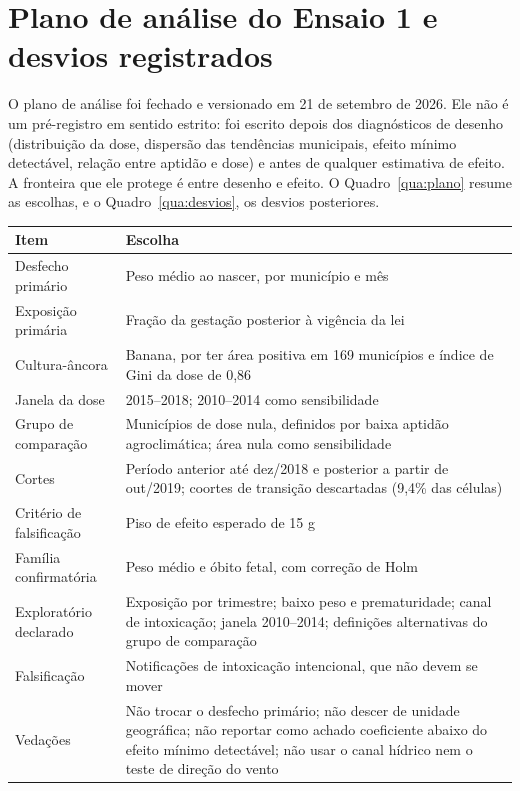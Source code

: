
\chapter{Plano de análise do Ensaio 1 e desvios registrados}
\label{ap:preespecificacao}

O plano de análise foi fechado e versionado em 21 de setembro de 2026. Ele não
é um pré-registro em sentido estrito: foi escrito depois dos diagnósticos de
desenho (distribuição da dose, dispersão das tendências municipais, efeito
mínimo detectável, relação entre aptidão e dose) e antes de qualquer estimativa
de efeito. A fronteira que ele protege é entre desenho e efeito. O
Quadro~\ref{qua:plano} resume as escolhas, e o Quadro~\ref{qua:desvios}, os
desvios posteriores.

\begin{quadro}[htb]
\centering
\caption{Escolhas do plano de análise}
\label{qua:plano}
\small
\begin{tabular}{|p{4.2cm}|p{10cm}|}
\hline
\textbf{Item} & \textbf{Escolha} \\
\hline
Desfecho primário & Peso médio ao nascer, por município e mês \\
\hline
Exposição primária & Fração da gestação posterior à vigência da lei \\
\hline
Cultura-âncora & Banana, por ter área positiva em 169 municípios e índice de
Gini da dose de 0,86 \\
\hline
Janela da dose & 2015--2018; 2010--2014 como sensibilidade \\
\hline
Grupo de comparação & Municípios de dose nula, definidos por baixa aptidão
agroclimática; área nula como sensibilidade \\
\hline
Cortes & Período anterior até dez/2018 e posterior a partir de out/2019;
coortes de transição descartadas (9,4\% das células) \\
\hline
Critério de falsificação & Piso de efeito esperado de 15 g \\
\hline
Família confirmatória & Peso médio e óbito fetal, com correção de Holm \\
\hline
Exploratório declarado & Exposição por trimestre; baixo peso e prematuridade;
canal de intoxicação; janela 2010--2014; definições alternativas do grupo de
comparação \\
\hline
Falsificação & Notificações de intoxicação intencional, que não devem se mover \\
\hline
Vedações & Não trocar o desfecho primário; não descer de unidade geográfica;
não reportar como achado coeficiente abaixo do efeito mínimo detectável; não
usar o canal hídrico nem o teste de direção do vento \\
\hline
\end{tabular}
\end{quadro}

